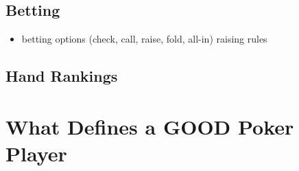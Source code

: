 \subsection{Betting}
\begin{itemize}
\item betting options (check, call, raise, fold, all-in)
\subitem raising rules

\end{itemize}
\subsection{Hand Rankings}
\section{What Defines a GOOD Poker Player}

